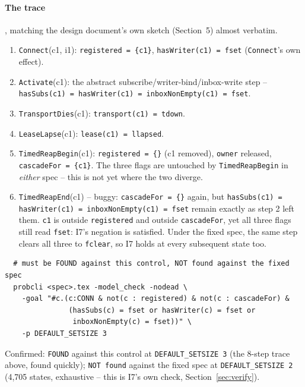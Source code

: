 \documentclass[a4paper,10pt,fleqn]{article}
\begin{document}
\paragraph{The trace}, matching the design document's own sketch (Section~5)
almost verbatim.
\begin{enumerate}
  \item \texttt{Connect}(c1, i1): \texttt{registered = \{c1\}},
    \texttt{hasWriter(c1) = fset} (\texttt{Connect}'s own effect).
  \item \texttt{Activate}(c1): the abstract subscribe/writer-bind/inbox-write
    step -- \texttt{hasSubs(c1) = hasWriter(c1) = inboxNonEmpty(c1) = fset}.
  \item \texttt{TransportDies}(c1): \texttt{transport(c1) = tdown}.
  \item \texttt{LeaseLapse}(c1): \texttt{lease(c1) = llapsed}.
  \item \texttt{TimedReapBegin}(c1): \texttt{registered = \{\}} (c1
    removed), \texttt{owner} released, \texttt{cascadeFor = \{c1\}}. The
    three flags are untouched by \texttt{TimedReapBegin} in \emph{either}
    spec -- this is not yet where the two diverge.
  \item \texttt{TimedReapEnd}(c1) -- buggy: \texttt{cascadeFor = \{\}}
    again, but \texttt{hasSubs(c1) = hasWriter(c1) = inboxNonEmpty(c1) =
    fset} remain exactly as step 2 left them. \texttt{c1} is outside
    \texttt{registered} and outside \texttt{cascadeFor}, yet all three
    flags still read \texttt{fset}: I7's negation is satisfied. Under the
    fixed spec, the same step clears all three to \texttt{fclear}, so I7
    holds at every subsequent state too.
\end{enumerate}

\begin{verbatim}
  # must be FOUND against this control, NOT found against the fixed spec
  probcli <spec>.tex -model_check -nodead \
    -goal "#c.(c:CONN & not(c : registered) & not(c : cascadeFor) &
               (hasSubs(c) = fset or hasWriter(c) = fset or
                inboxNonEmpty(c) = fset))" \
    -p DEFAULT_SETSIZE 3
\end{verbatim}

Confirmed: \texttt{FOUND} against this control at \texttt{DEFAULT\_SETSIZE
3} (the 8-step trace above, found quickly); \texttt{NOT found} against the
fixed spec at \texttt{DEFAULT\_SETSIZE 2} (4{,}705 states, exhaustive --
this is I7's own check, Section~\ref{sec:verify}).
\end{document}
